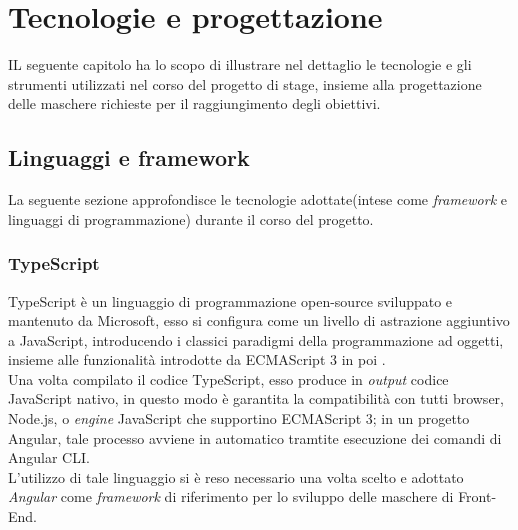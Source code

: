 
\chapter{Tecnologie e progettazione}
\label{cap:tecnologie-progettazione}
IL seguente capitolo ha lo scopo di illustrare nel dettaglio le tecnologie e gli strumenti utilizzati nel corso del progetto di stage, insieme alla progettazione delle maschere richieste per il raggiungimento degli obiettivi. 

\section{Linguaggi e framework}
La seguente sezione approfondisce le tecnologie adottate(intese come \textit{framework} e linguaggi di programmazione) durante il corso del progetto.

\subsection{TypeScript}\label{typescript}
\gls{TypeScript} è un linguaggio di programmazione open-source sviluppato e mantenuto da Microsoft, esso si configura come un livello di astrazione aggiuntivo a \gls{JavaScript}, introducendo i classici paradigmi della programmazione ad oggetti, insieme alle funzionalità introdotte da ECMAScript 3 in poi .\\
Una volta compilato il codice TypeScript, esso produce in \textit{output} codice JavaScript nativo, in questo modo è garantita la compatibilità con tutti browser, \gls{Node.js}, o \textit{engine} JavaScript che supportino ECMAScript 3; in un progetto Angular, tale processo avviene in automatico tramtite esecuzione dei comandi di \gls{Angular CLI}.\\
L'utilizzo di tale linguaggio si è reso necessario una volta scelto e adottato \textit{Angular} come \textit{framework} di riferimento per lo sviluppo delle maschere di Front-End.\\
\newpage
